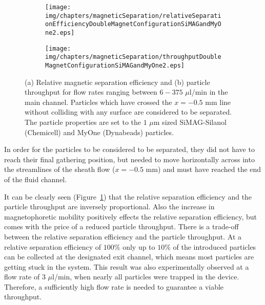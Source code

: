 \begin{figure}[htb]
        \centering
        \begin{subfigure}[b]{0.48\textwidth}
                \texttt{[image: img/chapters/magneticSeparation/relativeSeparationEfficiencyDoubleMagnetConfigurationSiMAGandMyOne2.eps]}
                \caption{}  
        \end{subfigure}
        \begin{subfigure}[b]{0.48\textwidth}
                \texttt{[image: img/chapters/magneticSeparation/throughputDoubleMagnetConfigurationSiMAGandMyOne2.eps]}
                \caption{}                
        \end{subfigure}
        \caption[Relative magnetic separation efficiency and particle throughput of two different particles types for different flow rates using the double magnet configuration]{(a) Relative magnetic separation efficiency and (b) particle throughput for flow rates ranging between $6 - 375$ $\mu$l/min in the main channel. Particles which have crossed the $x=-0.5$ mm line without colliding with any surface are considered to be separated. The particle properties are set to the $1$ $\mu$m sized SiMAG-Silanol (Chemicell) and MyOne (Dynabeads) particles.}
        \label{fig:relativeSeparationEfficiencyAndParticleThroughputDoubleMagnetConfiguration}
\end{figure}

In order for the particles to be considered to be separated, they did not have to reach their final gathering position, but needed to move horizontally across into the streamlines of the sheath flow ($x=-0.5$ mm) and must have reached the end of the fluid channel. 

It can be clearly seen (Figure~\ref{fig:relativeSeparationEfficiencyAndParticleThroughputDoubleMagnetConfiguration}) that the relative separation efficiency and the particle throughput are inversely proportional. Also the increase in magnetophoretic mobility positively effects the relative separation efficiency, but comes with the price of a reduced particle throughput. There is a trade-off between the relative separation efficiency and the particle throughput. At a relative separation efficiency of $100\%$ only up to $10\%$ of the introduced particles can be collected at the designated exit channel, which means most particles are getting stuck in the system. This result was also experimentally observed at a flow rate of $3$ $\mu$l/min, when nearly all particles were trapped in the device. Therefore, a sufficiently high flow rate is needed to guarantee a viable throughput. 

